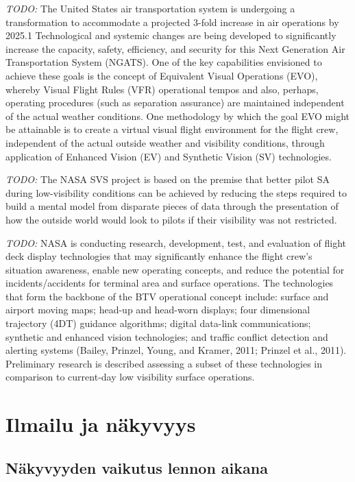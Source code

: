 \documentclass[utf8,bachelor,manualbib]{gradu3}
\begin{document}
\emph{TODO:}
The United States air transportation system is undergoing a transformation to accommodate a projected 3-fold
increase in air operations by 2025.1 Technological and systemic changes are being developed to significantly
increase the capacity, safety, efficiency, and security for this Next Generation Air Transportation System
(NGATS). One of the key capabilities envisioned to achieve these goals is the concept of Equivalent Visual
Operations (EVO), whereby Visual Flight Rules (VFR) operational tempos and also, perhaps, operating
procedures (such as separation assurance) are maintained independent of the actual weather conditions. One
methodology by which the goal EVO might be attainable is to create a virtual visual flight environment for
the flight crew, independent of the actual outside weather and visibility conditions, through application of
Enhanced Vision (EV) and Synthetic Vision (SV) technologies. \citep{baileyym2007}

\emph{TODO:}
The NASA SVS project is based on the premise that better pilot SA during
low-visibility conditions can be achieved by reducing the steps required to build a
mental model from disparate pieces of data through the presentation of how the
outside world would look to pilots if their visibility was not restricted. \citep{prinzel2004}


\emph{TODO:}
NASA is conducting research, development, test, and evaluation of flight deck display technologies that may significantly enhance the flight crew's situation awareness, enable new operating concepts, and reduce the potential for incidents/accidents for terminal area and surface operations. The technologies that form the backbone of the BTV operational concept include: surface and airport moving maps; head-up and head-worn displays; four dimensional trajectory (4DT) guidance algorithms; digital data-link communications; synthetic and enhanced vision technologies; and traffic conflict detection and alerting systems (Bailey, Prinzel, Young, and Kramer, 2011; Prinzel et al., 2011). Preliminary research is described assessing a subset of these technologies in comparison to current-day low visibility surface operations. \citep{prinzel2013}


\chapter{Ilmailu ja näkyvyys}

\section{Näkyvyyden vaikutus lennon aikana}
\end{document}

